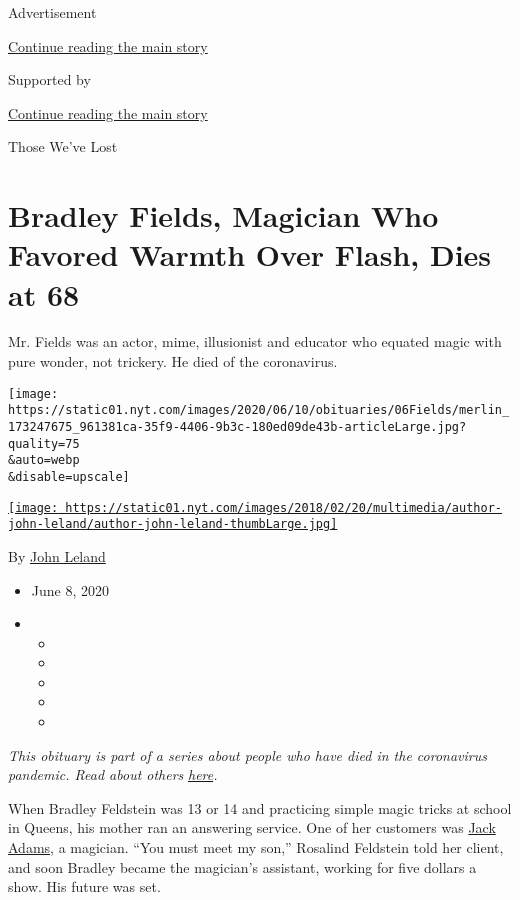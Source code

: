Advertisement

\protect\hyperlink{after-top}{Continue reading the main story}

Supported by

\protect\hyperlink{after-sponsor}{Continue reading the main story}

Those We've Lost

\hypertarget{bradley-fields-magician-who-favored-warmth-over-flash-dies-at-68}{%
\section{Bradley Fields, Magician Who Favored Warmth Over Flash, Dies at
68}\label{bradley-fields-magician-who-favored-warmth-over-flash-dies-at-68}}

Mr. Fields was an actor, mime, illusionist and educator who equated
magic with pure wonder, not trickery. He died of the coronavirus.

\texttt{[image: https://static01.nyt.com/images/2020/06/10/obituaries/06Fields/merlin\_173247675\_961381ca-35f9-4406-9b3c-180ed09de43b-articleLarge.jpg?quality=75\\\&auto=webp\\\&disable=upscale]}

\href{https://www.nytimes.com/by/john-leland}{\texttt{[image: https://static01.nyt.com/images/2018/02/20/multimedia/author-john-leland/author-john-leland-thumbLarge.jpg]}}

By \href{https://www.nytimes.com/by/john-leland}{John Leland}

\begin{itemize}
\item
  June 8, 2020
\item
  \begin{itemize}
  \item
  \item
  \item
  \item
  \item
  \end{itemize}
\end{itemize}

\emph{This obituary is part of a series about people who have died in
the coronavirus pandemic. Read about others}
\href{https://www.nytimes.com/interactive/2020/obituaries/people-died-coronavirus-obituaries.html}{\emph{here}}\emph{.}

When Bradley Feldstein was 13 or 14 and practicing simple magic tricks
at school in Queens, his mother ran an answering service. One of her
customers was
\href{https://www.magicana.com/news/blog/jack-adams-aka-merlin}{Jack
Adams}, a magician. ``You must meet my son,'' Rosalind Feldstein told
her client, and soon Bradley became the magician's assistant, working
for five dollars a show. His future was set.

